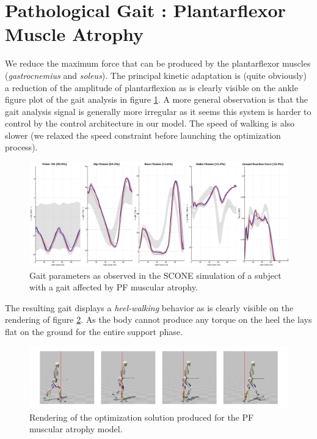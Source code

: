 \documentclass[11pt]{article}
\begin{document}
\section{Pathological Gait : Plantarflexor Muscle Atrophy}

We reduce the maximum force that can be produced by the plantarflexor muscles (\textit{gastrocnemius} and \textit{soleus}). The principal kinetic adaptation is (quite obviously) a reduction of the amplitude of plantarflexion as is clearly visible on the ankle figure plot of the gait analysis in figure \ref{atrophic_gait}. A more general observation is that the gait analysis signal is generally more irregular as it seems this system is harder to control by the control architecture in our model. The speed of walking is also slower (we relaxed the speed constraint before launching the optimization process).

\begin{figure}[h!]
    \centering
    \includegraphics[width=\textwidth]{screens/atrophy_gait.png}
    \caption{Gait parameters as observed in the SCONE simulation of a subject with a gait affected by PF muscular atrophy.}
    \label{atrophic_gait}
\end{figure}

The resulting gait displays a \textit{heel-walking} behavior as is clearly visible on the rendering of figure \ref{atrophic_render}. As the body cannot produce any torque on the heel the lays flat on the ground for the entire support phase.

\begin{figure}[h!]
    \centering
    \includegraphics[width=\textwidth]{screens/heel_walk.jpg}
    \caption{Rendering of the optimization solution produced for the PF muscular atrophy model.}
    \label{atrophic_render}
\end{figure}
\end{document}
